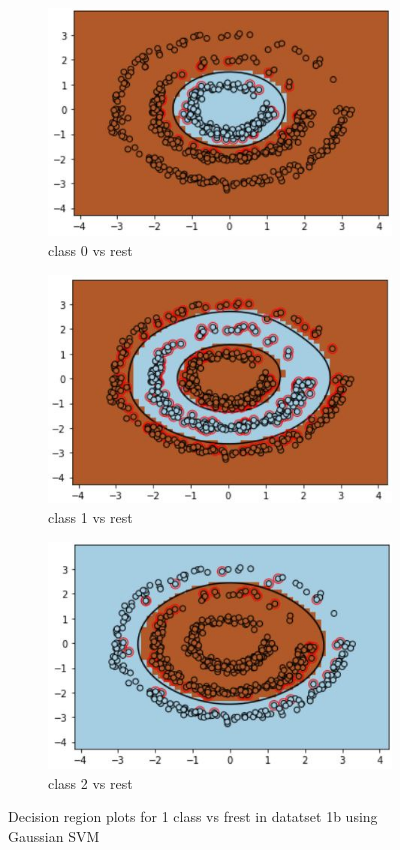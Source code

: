 \documentclass[11pt]{article}
\begin{document}
\begin{figure}[h]
\centering
	\begin{subfigure}[b]{0.45\textwidth}
	\centering
	\includegraphics[scale=0.7]{dataset1b_gauss_svm_0_ds.jpg}
	\caption{class 0 vs rest}
	\label{fig:fig2.3.4.1}
	\end{subfigure}
	\begin{subfigure}[b]{0.45\textwidth}
	\centering
	\includegraphics[scale=0.7]{dataset1b_gauss_svm_1_ds.jpg}
	\caption{class 1 vs rest}
	\label{fig:fig2.3.4.2}
	\end{subfigure}
	\begin{subfigure}[b]{0.45\textwidth}
	\centering
	\includegraphics[scale=0.7]{dataset1b_gauss_svm_2_ds.jpg}
	\caption{class 2 vs rest}
	\label{fig:fig2.3.4.3}
	\end{subfigure}
\caption{Decision region plots for 1 class vs frest in datatset 1b using Gaussian SVM}
\label{fig:fig2.3.4}
\end{figure}
\end{document}
